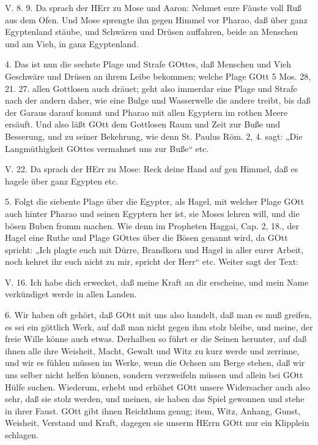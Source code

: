 \begin{schriftzitat}
V. 8. 9. Da sprach der HErr zu Mose und Aaron: Nehmet eure Fäuste voll Ruß aus dem Ofen. Und Mose sprengte ihn gegen Himmel vor Pharao, daß über ganz Egyptenland stäube, und Schwären und Drüsen auffahren, beide an Menschen und am Vieh, in ganz Egyptenland.
\end{schriftzitat}

4. Das ist nun die sechste Plage und Strafe GOttes, daß Menschen und Vieh Geschwäre und Drüsen an ihrem Leibe bekommen; welche Plage GOtt 5 Mos. 28, 21. 27. allen Gottlosen auch dräuet; geht also immerdar eine Plage und Strafe nach der andern daher, wie eine Bulge und Wasserwelle die andere treibt, bis daß der Garaus darauf kommt und Pharao mit allen Egyptern im rothen Meere ersäuft. Und also läßt GOtt dem Gottlosen Raum und Zeit zur Buße und Besserung, und zu seiner Bekehrung, wie denn St. Paulus Röm. 2, 4. sagt: „Die Langmüthigkeit GOttes vermahnet uns zur Buße“ etc.

\begin{schriftzitat}
V. 22. Da sprach der HErr zu Mose: Reck deine Hand auf gen Himmel, daß es hagele über ganz Egypten etc.
\end{schriftzitat}

5. Folgt die siebente Plage über die Egypter, als Hagel, mit welcher Plage GOtt auch hinter Pharao und seinen Egyptern her ist, sie Moses lehren will, und die bösen Buben fromm machen. Wie denn im Propheten Haggai, Cap. 2, 18., der Hagel eine Ruthe und Plage GOttes über die Bösen genannt wird, da GOtt spricht: „Ich plagte euch mit Dürre, Brandkorn und Hagel in aller eurer Arbeit, noch kehret ihr euch nicht zu mir, spricht der Herr“ etc. Weiter sagt der Text:

\begin{schriftzitat}
V. 16. Ich habe dich erwecket, daß meine Kraft an dir erscheine, und mein Name verkündiget werde in allen Landen.
\end{schriftzitat}

6. Wir haben oft gehört, daß GOtt mit uns also handelt, daß man es muß greifen, es sei ein göttlich Werk, auf daß man nicht gegen ihm stolz bleibe, und meine, der freie Wille könne auch etwas. Derhalben so führt er die Seinen herunter, auf daß ihnen alle ihre Weisheit, Macht, Gewalt und Witz zu kurz werde und zerrinne, und wir es fühlen müssen im Werke, wenn die Ochsen am Berge stehen, daß wir uns selber nicht helfen können, sondern verzweifeln müssen und allein bei GOtt Hülfe suchen. Wiederum, erhebt und erhöhet GOtt unsere Widersacher auch also sehr, daß sie stolz werden, und meinen, sie haben das Spiel gewonnen und stehe in ihrer Faust. GOtt gibt ihnen Reichthum genug; item, Witz, Anhang, Gunst, Weisheit, Verstand und Kraft, dagegen sie unserm HErrn GOtt nur ein Klipplein schlagen.

